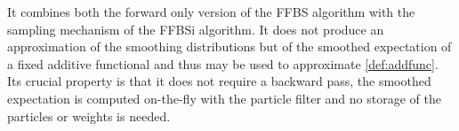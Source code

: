\documentclass[12pt]{article}
\newcommand{\1}{\mathrm{1}}
\begin{document}
It combines both the forward only version of the FFBS algorithm with the sampling mechanism of the FFBSi algorithm. It does not produce an approximation of the smoothing distributions but of the smoothed expectation of a fixed additive functional and thus  may be used to approximate \eqref{def:addfunc}. 
Its crucial property is that it does not require a backward pass, the smoothed expectation is computed on-the-fly with the particle filter and no storage of the particles or weights is needed. 
\end{document}
